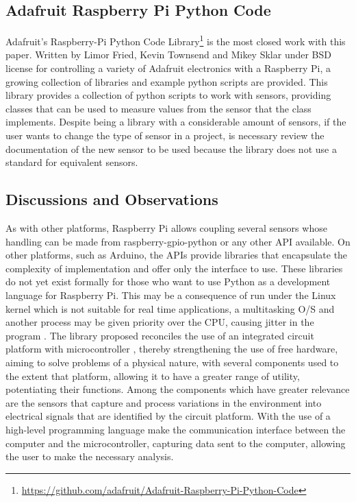 \documentclass{acm_proc_article-sp}
\begin{document}
\subsection{Adafruit Raspberry Pi Python Code}
Adafruit's Raspberry-Pi Python Code Library\footnote{\url{https://github.com/adafruit/Adafruit-Raspberry-Pi-Python-Code}} is the most closed work with this paper. Written by Limor Fried, Kevin Townsend and Mikey Sklar under BSD license for controlling a variety of Adafruit electronics with a Raspberry Pi, a growing collection of libraries and example python scripts are provided.
\newline
\newline
This library provides a collection of python scripts to work with sensors, providing classes that can be used to measure values from the sensor that the class implements. 
\newline
\newline
Despite being a library with a considerable amount of sensors, if the user wants to change the type of sensor in a project, is necessary review the documentation of the new sensor to be used because the library does not use a standard for equivalent sensors.

\subsection{Discussions and Observations}
\label{sec:justification}
As with other platforms, Raspberry Pi allows coupling several sensors whose handling can be made from raspberry-gpio-python or any other API available. On other platforms, such as Arduino, the APIs provide libraries that encapsulate the complexity of implementation and offer only the interface to use. These libraries do not yet exist formally for those who want to use Python as a development language for Raspberry Pi.
\newline
\newline
This may be a consequence of run under the Linux kernel which is not suitable for real time applications, a multitasking O/S and another process may be given priority over the CPU, causing jitter in the program \cite{Oracle}.
\newline
\newline
The library proposed reconciles the use of an integrated circuit platform with microcontroller , thereby strengthening the use of free hardware, aiming to solve problems of a physical nature, with several components used to the extent that platform, allowing it to have a greater range of utility, potentiating their functions. Among the components which have greater relevance are the sensors that capture and process variations in the environment into electrical signals that are identified by the circuit platform. With the use of a high-level programming language make the communication interface between the computer and the microcontroller, capturing data sent to the computer, allowing the user to make the necessary analysis.
\end{document}
